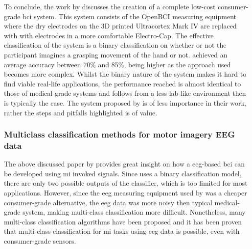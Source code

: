 To conclude, the work by  discusses the creation of a complete low-cost consumer-grade \gls{bci} system.
This system consists of the OpenBCI measuring equipment where the dry electrodes on the 3D printed Ultracortex Mark IV are replaced with with electrodes in a more comfortable Electro-Cap.
The effective classification of the system is a binary  classification on whether or not the participant imagines a grasping movement of the hand or not.
 achieved an average accuracy between 70\% and 85\%, being higher as the approach used becomes more complex.
Whilst the binary nature of the system makes it hard to find viable real-life applications, the performance reached is almost identical to those of medical-grade systems and follows from a less lab-like environment then is typically the case.
The system proposed by  is of less importance in their work, rather the steps and pitfalls highlighted is of value.




\subsubsection{Multiclass classification methods for motor imagery EEG data}
\label{subsubsec:bci_small_projects_motivating_examples_mi_classification}

The above discussed paper by \citet{cheap_bci_feasibility} provides great insight on how a \gls{eeg}-based \gls{bci} can be developed using \gls{mi} invoked signals.
Since \citet{cheap_bci_feasibility} uses a binary classification model, there are only two possible outputs of the classifier, which is too limited for most applications.
However, since the \gls{eeg} measuring equipment used by \citet{cheap_bci_feasibility} was a cheaper consumer-grade alternative, the \gls{eeg} data was more noisy then typical medical-grade system, making multi-class classification more difficult.
Nonetheless, many multi-class classification algorithms have been proposed and it has been proven that multi-class classification for \gls{mi} tasks using \gls{eeg} data is possible, even with consumer-grade sensors.




